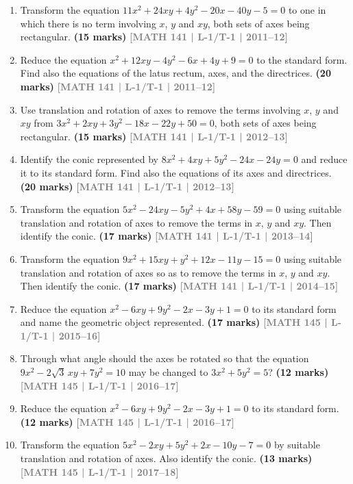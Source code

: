 \documentclass[12pt,a4paper]{article}
\newcommand{\yr}[1]{\hfill\textcolor{gray}{\small\textbf{[#1]}}}
\newcommand{\mk}[1]{\textcolor{orange!70!black}{\small\textbf{(#1 marks)}}}
\begin{document}
\begin{enumerate}
\item Transform the equation $11x^{2}+24xy+4y^{2}-20x-40y-5=0$ to one in which there is no term involving $x$, $y$ and $xy$, both sets of axes being rectangular.
\mk{15} \yr{MATH 141 | L-1/T-1 | 2011--12}

\item Reduce the equation $x^{2}+12xy-4y^{2}-6x+4y+9=0$ to the standard form. Find also the equations of the latus rectum, axes, and the directrices.
\mk{20} \yr{MATH 141 | L-1/T-1 | 2011--12}

\item Use translation and rotation of axes to remove the terms involving $x$, $y$ and $xy$ from $3x^{2}+2xy+3y^{2}-18x-22y+50=0$, both sets of axes being rectangular.
\mk{15} \yr{MATH 141 | L-1/T-1 | 2012--13}

\item Identify the conic represented by $8x^{2}+4xy+5y^{2}-24x-24y=0$ and reduce it to its standard form. Find also the equations of its axes and directrices.
\mk{20} \yr{MATH 141 | L-1/T-1 | 2012--13}

\item Transform the equation $5x^{2}-24xy-5y^{2}+4x+58y-59=0$ using suitable translation and rotation of axes to remove the terms in $x$, $y$ and $xy$. Then identify the conic.
\mk{17} \yr{MATH 141 | L-1/T-1 | 2013--14}

\item Transform the equation $9x^{2}+15xy+y^{2}+12x-11y-15=0$ using suitable translation and rotation of axes so as to remove the terms in $x$, $y$ and $xy$. Then identify the conic.
\mk{17} \yr{MATH 141 | L-1/T-1 | 2014--15}

\item Reduce the equation $x^{2}-6xy+9y^{2}-2x-3y+1=0$ to its standard form and name the geometric object represented.
\mk{17} \yr{MATH 145 | L-1/T-1 | 2015--16}

\item Through what angle should the axes be rotated so that the equation $9x^{2}-2\sqrt{3}\,xy+7y^{2}=10$ may be changed to $3x^{2}+5y^{2}=5$?
\mk{12} \yr{MATH 145 | L-1/T-1 | 2016--17}

\item Reduce the equation $x^{2}-6xy+9y^{2}-2x-3y+1=0$ to its standard form.
\mk{12} \yr{MATH 145 | L-1/T-1 | 2016--17}

\item Transform the equation $5x^{2}-2xy+5y^{2}+2x-10y-7=0$ by suitable translation and rotation of axes. Also identify the conic.
\mk{13} \yr{MATH 145 | L-1/T-1 | 2017--18}


\end{enumerate}
\end{document}
